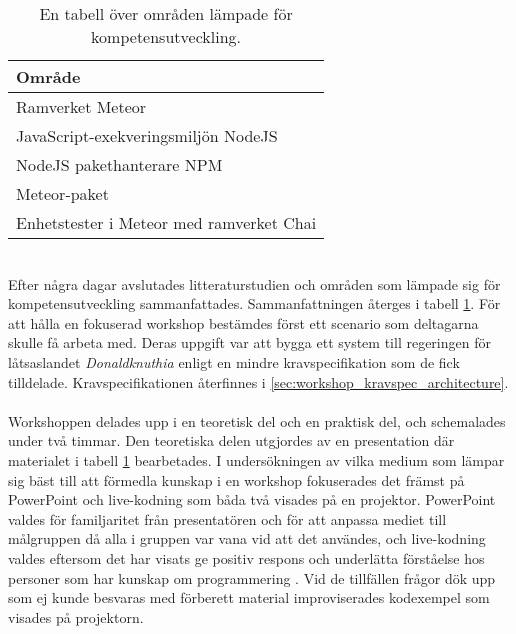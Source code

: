 \begin{table}[h!]
  \centering
  \caption{En tabell över områden lämpade för kompetensutveckling.}
  \def\arraystretch{1.5}
  \begin{adjustbox}{max width=\textwidth}
    \begin{tabularx}{\textwidth}{ | X | }
      \hline
      \textbf{Område} \\
      \hline
      Ramverket Meteor \\
      \hline
      JavaScript-exekveringsmiljön NodeJS \\
      \hline 
      NodeJS pakethanterare NPM \\
      \hline
      Meteor-paket \\
      \hline
      Enhetstester i Meteor med ramverket Chai \\
      \hline
    \end{tabularx}
  \end{adjustbox}
  \label{tab:workshop_kompetensutveckling}
\end{table}
\ \\
Efter några dagar avslutades litteraturstudien och områden som lämpade sig för kompetensutveckling
sammanfattades. Sammanfattningen återges i tabell \ref{tab:workshop_kompetensutveckling}.
För att hålla en fokuserad workshop bestämdes först ett scenario som deltagarna skulle få arbeta med.
Deras uppgift var att bygga ett system till regeringen för låtsaslandet \textit{Donaldknuthia}
enligt en mindre kravspecifikation som de fick tilldelade. Kravspecifikationen återfinnes i
 \ref{sec:workshop_kravspec_architecture}.
\ \\
Workshoppen delades upp i en teoretisk del och en praktisk del, och schemalades under två timmar.
Den teoretiska delen utgjordes av en presentation där materialet i tabell
\ref{tab:workshop_kompetensutveckling} bearbetades.
I undersökningen av vilka medium som lämpar sig bäst till att förmedla kunskap i en workshop
fokuserades det främst på PowerPoint och live-kodning som båda två visades på en projektor.
PowerPoint valdes för familjaritet från presentatören och för att anpassa mediet till
målgruppen då alla i gruppen var vana vid att det användes,
och live-kodning valdes eftersom det har visats ge positiv respons och underlätta
förståelse hos personer som har kunskap om programmering \cite{live_coding_for_all}.
Vid de tillfällen frågor dök upp som ej kunde besvaras med förberett material
improviserades kodexempel som visades på projektorn.
\\ \\
